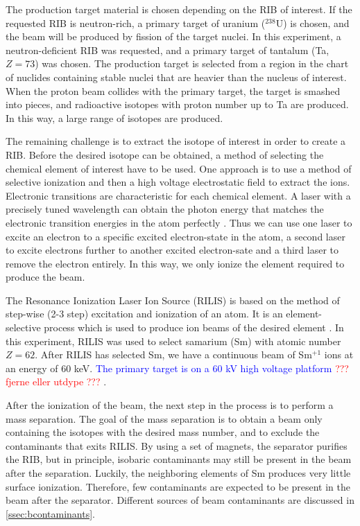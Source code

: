 \documentclass[twoside,english]{uiofysmaster/uiofysmaster}
\let\orgautoref\autoref
\renewcommand{\autoref}
        {%
		 \def\sectionautorefname{Section}%
		 \def\subsectionautorefname{Section}%
		 \def\subsubsectionautorefname{Section}%
		 \def\chapterautorefname{Chapter}%
          \orgautoref}
\begin{document}
The production target material is chosen depending on the RIB of interest. 
If the requested RIB is neutron-rich, a primary target of uranium ($^{238}$U) is chosen, and the beam will be produced by fission of the target nuclei.
In this experiment, a neutron-deficient RIB was requested, and a primary target of tantalum (Ta, $Z = 73$) was chosen.
The production target is selected from a region in the chart of nuclides containing stable nuclei that are heavier than the nucleus of interest.
When the proton beam collides with the primary target, the target is smashed into pieces, and radioactive isotopes with proton number up to Ta are produced.
In this way, a large range of isotopes are produced. 

The remaining challenge is to extract the isotope of interest in order to create a RIB. 
Before the desired isotope can be obtained, a method of selecting the chemical element of interest have to be used.
One approach is to use a method of selective ionization and then a high voltage electrostatic field to extract the ions. 
Electronic transitions are characteristic for each chemical element. 
A laser with a precisely tuned wavelength can obtain the photon energy that matches the electronic transition energies in the atom perfectly \cite{RILIS-web, RILIS2013}. 
Thus we can use one laser to excite an electron to a specific excited electron-state in the atom, a second laser to excite electrons further to another excited electron-sate and a third laser to remove the electron entirely. 
In this way, we only ionize the element required to produce the beam. 

The Resonance Ionization Laser Ion Source (RILIS) is based on the method of step-wise (2-3 step) excitation and ionization of an atom. 
It is an element-selective process which is used to produce ion beams of the desired element \cite{RILIS}. 
In this experiment, RILIS was used to select samarium (Sm) with atomic number $Z = 62$. 
After RILIS has selected Sm, we have a continuous beam of Sm$^{+1}$ ions at an energy of 60 keV. 
\textcolor{blue}{The primary target is on a 60 kV high voltage platform} \textcolor{red}{??? fjerne eller utdype ???} \cite{ISOLDE-web, TIF}. 

After the ionization of the beam, the next step in the process is to perform a mass separation.
The goal of the mass separation is to obtain a beam only containing the isotopes with the desired mass number, and to exclude the contaminants that exits RILIS. 
By using a set of magnets, the separator purifies the RIB, but in principle, isobaric contaminants may still be present in the beam after the separation. 
Luckily, the neighboring elements of Sm produces very little surface ionization. 
Therefore, few contaminants are expected to be present in the beam after the separator. 
Different sources of beam contaminants are discussed in \autoref{ssec:bcontaminants}.
\end{document}
